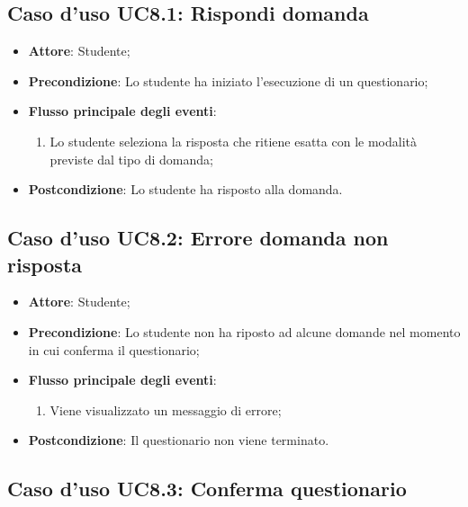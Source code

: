 \documentclass[12pt,a4paper]{article}
\begin{document}
\subsection{Caso d'uso UC8.1: Rispondi domanda}

\begin{itemize}

\item \textbf{Attore}: Studente; 
\item \textbf{Precondizione}: Lo studente ha iniziato l'esecuzione di un questionario;

\item \textbf{Flusso principale degli eventi}:
\begin{enumerate}
	\item Lo studente seleziona la risposta che ritiene esatta con le modalità previste dal tipo di domanda;
	
\end{enumerate}
\item \textbf{Postcondizione}: Lo studente ha risposto alla domanda.
\end{itemize}
\hypertarget{UC8.2}{}
\subsection{Caso d'uso UC8.2: Errore domanda non risposta}

\begin{itemize}

\item \textbf{Attore}: Studente; 
\item \textbf{Precondizione}: Lo studente non ha riposto ad alcune domande nel momento in cui conferma il questionario;

\item \textbf{Flusso principale degli eventi}:
\begin{enumerate}
	\item Viene visualizzato un messaggio di errore;
	
\end{enumerate}
\item \textbf{Postcondizione}: Il questionario non viene terminato.
\end{itemize}
\hypertarget{UC8.3}{}
\subsection{Caso d'uso UC8.3: Conferma  questionario}
\end{document}

